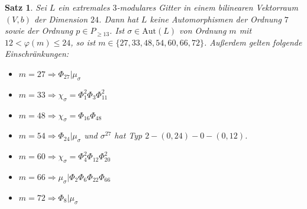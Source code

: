 \documentclass[12pt,a4paper,halfparskip,headsepline,bibtotocnumbered]{scrreprt}
\theoremstyle{nummermitklammern}
\newtheorem{satz}[defsatzusw]{Satz}
\theoremstyle{nonumberbreak}
\newcommand{\Aut}{\text{Aut}}
\begin{document}
\begin{framed}
	\begin{satz}
		Sei $L$ ein extremales $3$-modulares Gitter in einem bilinearen Vektorraum $(V,b)$ der Dimension $24$. Dann hat $L$ keine Automorphismen der Ordnung $7$ sowie der Ordnung $p \in P_{\ge 13}$. Ist $\sigma \in \Aut(L)$ von Ordnung $m$ mit $12 < \varphi(m) \leq 24$, so ist\linebreak
		$m \in \lbrace 27, 33, 48, 54, 60, 66, 72\rbrace$. Außerdem gelten folgende Einschränkungen:
		\begin{itemize}
			\item $m = 27 \Rightarrow \Phi_{27} \vert \mu_\sigma$
			\item $m = 33 \Rightarrow \chi_\sigma = \Phi_1^2 \Phi_3 \Phi_{11}^2$
			\item $m = 48 \Rightarrow \chi_\sigma = \Phi_{16} \Phi_{48}$
			\item $m = 54 \Rightarrow \Phi_{24} \vert \mu_\sigma$ und $\sigma^{27}$ hat Typ $2 - (0, 24) - 0 - (0, 12)$.
			\item $m = 60 \Rightarrow \chi_\sigma = \Phi_4^2 \Phi_{12} \Phi_{20}^2$
			\item $m = 66 \Rightarrow \mu_\sigma \vert \Phi_{2} \Phi_{6} \Phi_{22} \Phi_{66}$
			\item $m = 72 \Rightarrow \Phi_8 \vert \mu_\sigma$
		\end{itemize}
	\end{satz}
\end{framed}
\end{document}
